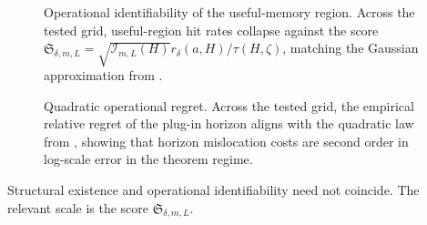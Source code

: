 \begin{figure}[!htbp]
\centering
{}
\caption{Operational identifiability of the useful-memory region. Across the tested grid,
useful-region hit rates collapse against the score
$\mathfrak S_{\delta,m,L} = \sqrt{\mathcal I_{m,L}(H)}r_\delta(a,H)/\tau(H,\zeta)$,
matching the Gaussian approximation from .}
\label{fig:inferable_horizon}
\end{figure}

\begin{figure}[!htbp]
\centering
{}
\caption{Quadratic operational regret. Across the tested grid, the empirical
relative regret of the plug-in horizon aligns with the quadratic law from
, showing that horizon mislocation costs are
second order in log-scale error in the theorem regime.}
\label{fig:inferable_horizon_regret}
\end{figure}

Structural existence and operational identifiability need not coincide. The
relevant scale is the score $\mathfrak S_{\delta,m,L}$.
